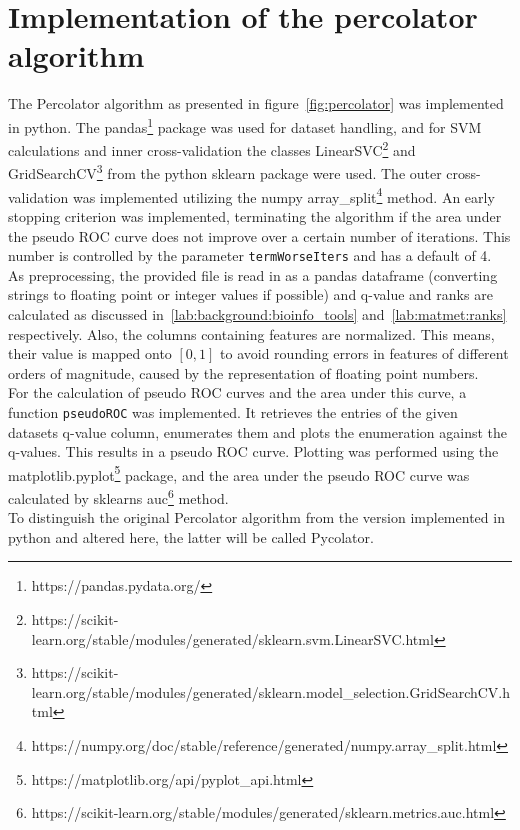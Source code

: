 \section{Implementation of the percolator algorithm}
The Percolator algorithm as presented in figure~\ref{fig:percolator} was implemented in python. The pandas\footnote{https://pandas.pydata.org/} package was used for dataset handling, and for SVM calculations and inner cross-validation the classes LinearSVC\footnote{https://scikit-learn.org/stable/modules/generated/sklearn.svm.LinearSVC.html} and GridSearchCV\footnote{https://scikit-learn.org/stable/modules/generated/sklearn.model\_selection.GridSearchCV.html} from the python sklearn package were used. The outer cross-validation was implemented utilizing the numpy array\_split\footnote{https://numpy.org/doc/stable/reference/generated/numpy.array\_split.html} method. An early stopping criterion was implemented, terminating the algorithm if the area under the pseudo ROC curve does not improve over a certain number of iterations. This number is controlled by the parameter \texttt{termWorseIters} and has a default of 4.\\
\label{lab:matmet:normalization}As preprocessing, the provided file is read in as a pandas dataframe (converting strings to floating point or integer values if possible) and q-value and ranks are calculated as discussed in~\ref{lab:background:bioinfo_tools} and~\ref{lab:matmet:ranks} respectively. Also, the columns containing features are normalized. This means, their value is mapped onto $[0,1]$ to avoid rounding errors in features of different orders of magnitude, caused by the representation of floating point numbers.\\
\label{lab:matmet:pseudoROC}For the calculation of pseudo ROC curves and the area under this curve, a function \texttt{pseudoROC} was implemented. It retrieves the entries of the given datasets q-value column, enumerates them and plots the enumeration against the q-values. This results in a pseudo ROC curve. Plotting was performed using the matplotlib.pyplot\footnote{https://matplotlib.org/api/pyplot\_api.html} package, and the area under the pseudo ROC curve was calculated by sklearns auc\footnote{https://scikit-learn.org/stable/modules/generated/sklearn.metrics.auc.html} method.\\
To distinguish the original Percolator algorithm from the version implemented in python and altered here, the latter will be called Pycolator.

